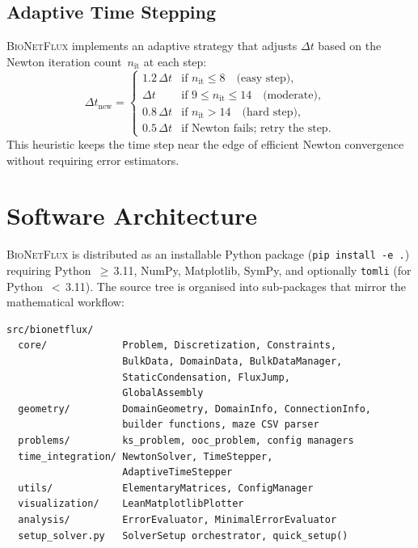 \documentclass[11pt,a4paper]{article}
\newcommand{\bionetflux}{\textsc{BioNetFlux}}
\begin{document}
\subsection{Adaptive Time Stepping}

\bionetflux{} implements an adaptive strategy that adjusts $\Delta t$
based on the Newton iteration count~$n_{\text{it}}$ at each step:
\[
  \Delta t_{\text{new}} =
  \begin{cases}
    1.2\,\Delta t & \text{if } n_{\text{it}} \leq 8\quad
                     \text{(easy step)},\\
    \Delta t       & \text{if } 9\leq n_{\text{it}}\leq 14\quad
                     \text{(moderate)},\\
    0.8\,\Delta t & \text{if } n_{\text{it}} > 14\quad
                     \text{(hard step)},\\
    0.5\,\Delta t & \text{if Newton fails; retry the step}.
  \end{cases}
\]
This heuristic keeps the time step near the edge of efficient Newton
convergence without requiring error estimators.


\section{Software Architecture}\label{sec:architecture}

\bionetflux{} is distributed as an installable Python package
(\texttt{pip install -e .}) requiring Python~$\geq$\,3.11,
NumPy, Matplotlib, SymPy, and optionally \texttt{tomli} (for
Python~$<$\,3.11).  The source tree is organised into
sub-packages that mirror the mathematical workflow:

\begin{highlightbox}[title=Package layout]
\small
\begin{verbatim}
src/bionetflux/
  core/             Problem, Discretization, Constraints,
                    BulkData, DomainData, BulkDataManager,
                    StaticCondensation, FluxJump,
                    GlobalAssembly
  geometry/         DomainGeometry, DomainInfo, ConnectionInfo,
                    builder functions, maze CSV parser
  problems/         ks_problem, ooc_problem, config managers
  time_integration/ NewtonSolver, TimeStepper,
                    AdaptiveTimeStepper
  utils/            ElementaryMatrices, ConfigManager
  visualization/    LeanMatplotlibPlotter
  analysis/         ErrorEvaluator, MinimalErrorEvaluator
  setup_solver.py   SolverSetup orchestrator, quick_setup()
\end{verbatim}
\end{highlightbox}
\end{document}
